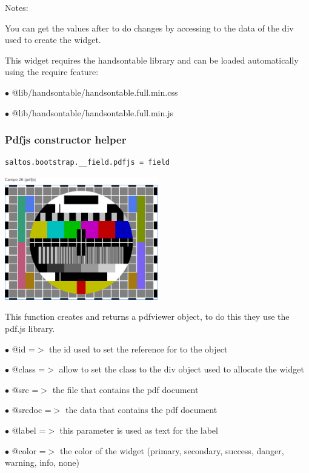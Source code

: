 \documentclass[a4paper]{article}
\begin{document}
Notes:

You can get the values after to do changes by accessing to the data of the div used to create
the widget.

This widget requires the handsontable library and can be loaded automatically using the require
feature:

\begin{compactitem}
\item[\color{myblue}$\bullet$] @lib/handsontable/handsontable.full.min.css
\item[\color{myblue}$\bullet$] @lib/handsontable/handsontable.full.min.js
\end{compactitem}

\hypertarget{toc74}{}
\subsubsection{Pdfjs constructor helper}

\begin{lstlisting}
saltos.bootstrap.__field.pdfjs = field
\end{lstlisting}

\begin{center}\includegraphics[width=0.5\textwidth]{../ujest/snaps/test-bootstrap-js-bootstrap-campo-26-pdfjs-1-snap.png}\end{center}

This function creates and returns a pdfviewer object, to do this they use the pdf.js library.

\begin{compactitem}
\item[\color{myblue}$\bullet$] @id     =$>$ the id used to set the reference for to the object
\item[\color{myblue}$\bullet$] @class  =$>$ allow to set the class to the div object used to allocate the widget
\item[\color{myblue}$\bullet$] @src    =$>$ the file that contains the pdf document
\item[\color{myblue}$\bullet$] @srcdoc =$>$ the data that contains the pdf document
\item[\color{myblue}$\bullet$] @label  =$>$ this parameter is used as text for the label
\item[\color{myblue}$\bullet$] @color  =$>$ the color of the widget (primary, secondary, success, danger, warning, info, none)
\end{compactitem}
\end{document}
